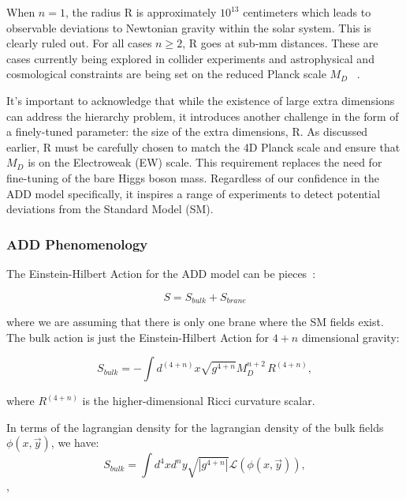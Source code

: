 When $n=1$, the radius R is approximately $10^{13}$ centimeters which leads to observable deviations to Newtonian gravity within the solar system. This is clearly ruled out. For all cases $n \geq 2$, R goes at sub-mm distances. These are cases currently being explored in collider experiments and astrophysical and cosmological constraints are being set on the reduced Planck scale $M_D$ ~\cite{ParticleDataGroup:2020ssz}.

It's important to acknowledge that while the existence of large extra dimensions can address the hierarchy problem, it introduces another challenge in the form of a finely-tuned parameter: the size of the extra dimensions, R. As discussed earlier, R must be carefully chosen to match the 4D Planck scale and ensure that $M_D$ is on the Electroweak (EW) scale. This requirement replaces the need for fine-tuning of the bare Higgs boson mass. Regardless of our confidence in the ADD model specifically, it inspires a range of experiments to detect potential deviations from the Standard Model (SM). 

\subsubsection{ADD Phenomenology}

The Einstein-Hilbert Action for the ADD model can be 
pieces~\cite{Kribs:2006mq}: 


\begin{equation}
    \label{eq:ADDAction}
    S = S_{bulk} + S_{brane}
\end{equation}

where we are assuming that there is only one brane where the SM fields exist. The bulk action is just the Einstein-Hilbert Action for $4+n$ dimensional gravity:

\begin{equation}
    \label{eq:SBulkADD}
     S_{bulk} = -\int d^{(4+n)}x \sqrt{g^{4+n}}M^{n+2}_{D} \, R^{(4+n)}, 
\end{equation}

where $R^{(4+n)}$ is the higher-dimensional Ricci curvature scalar. 

In terms of the lagrangian density for the lagrangian density of the bulk fields $\phi(x,\Vec{y})$, we have:
\begin{equation}
    \label{eq:SBulkADD}
     S_{bulk} = \int d^{4}xd^ny \sqrt{|g^{4+n}|} \mathcal{L}(\phi(x,\Vec{y})), 
\end{equation}, 

